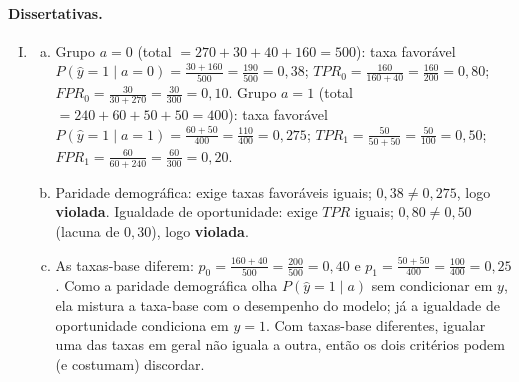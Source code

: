 \documentclass{dlproblemset}
\begin{document}
\paragraph{Dissertativas.}
\begin{enumerate}[I)]
    \item
    \begin{enumerate}[(a)]
        \item Grupo $a{=}0$ (total $=270+30+40+160=500$): taxa favorável $P(\hat{y}{=}1\mid a{=}0)=\frac{30+160}{500}=\frac{190}{500}=0{,}38$; $TPR_0=\frac{160}{160+40}=\frac{160}{200}=0{,}80$; $FPR_0=\frac{30}{30+270}=\frac{30}{300}=0{,}10$. Grupo $a{=}1$ (total $=240+60+50+50=400$): taxa favorável $P(\hat{y}{=}1\mid a{=}1)=\frac{60+50}{400}=\frac{110}{400}=0{,}275$; $TPR_1=\frac{50}{50+50}=\frac{50}{100}=0{,}50$; $FPR_1=\frac{60}{60+240}=\frac{60}{300}=0{,}20$.
        \item Paridade demográfica: exige taxas favoráveis iguais; $0{,}38 \neq 0{,}275$, logo \textbf{violada}. Igualdade de oportunidade: exige $TPR$ iguais; $0{,}80 \neq 0{,}50$ (lacuna de $0{,}30$), logo \textbf{violada}.
        \item As taxas-base diferem: $p_0=\frac{160+40}{500}=\frac{200}{500}=0{,}40$ e $p_1=\frac{50+50}{400}=\frac{100}{400}=0{,}25$. Como a paridade demográfica olha $P(\hat{y}{=}1\mid a)$ sem condicionar em $y$, ela mistura a taxa-base com o desempenho do modelo; já a igualdade de oportunidade condiciona em $y{=}1$. Com taxas-base diferentes, igualar uma das taxas em geral não iguala a outra, então os dois critérios podem (e costumam) discordar.
    \end{enumerate}


\end{enumerate}
\end{document}
